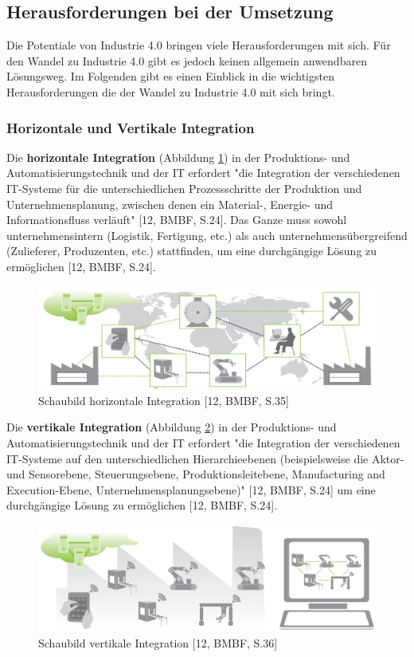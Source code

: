 \subsection{Herausforderungen bei der Umsetzung}\label{sec:HerausforderungenUmsetzung}

Die Potentiale von Industrie 4.0 bringen viele Herausforderungen mit sich. Für den Wandel zu Industrie 4.0 gibt es jedoch keinen allgemein anwendbaren Lösungsweg. Im Folgenden gibt es einen Einblick in die wichtigsten Herausforderungen die der Wandel zu Industrie 4.0 mit sich bringt.

\subsubsection{Horizontale und Vertikale Integration}\label{sec:HorizontaleVertikaleIntegration}
Die \textbf{horizontale Integration} (Abbildung \ref{fig:HorizontaleIntegration}) in der Produktions- und Automatisierungstechnik und der IT erfordert "die Integration der verschiedenen IT-Systeme für die unterschiedlichen Prozessschritte der Produktion und Unternehmensplanung, zwischen denen ein Material-, Energie- und Informationsfluss verläuft" [12, BMBF, S.24]. Das Ganze muss sowohl unternehmensintern (Logistik, Fertigung, etc.) als auch unternehmensübergreifend (Zulieferer, Produzenten, etc.) stattfinden, um eine durchgängige Lösung zu ermöglichen [12, BMBF, S.24].

\begin{figure}[h]
	\centering
	\includegraphics[width=0.5\linewidth]{Bilder/A3_HorizontaleIntegration}
	\caption{Schaubild horizontale Integration [12, BMBF, S.35]}
	\label{fig:HorizontaleIntegration}
\end{figure}

Die \textbf{vertikale Integration} (Abbildung \ref{fig:VertikaleIntegration}) in der Produktions- und Automatisierungstechnik und der IT erfordert "die Integration der verschiedenen IT-Systeme auf den unterschiedlichen Hierarchieebenen (beispielsweise die Aktor- und Sensorebene, Steuerungsebene, Produktionsleitebene, Manufacturing and Execution-Ebene, Unternehmensplanungsebene)" [12, BMBF, S.24] um eine durchgängige Lösung zu ermöglichen [12, BMBF, S.24].

\begin{figure}[h]
	\centering
	\includegraphics[width=0.5\linewidth]{Bilder/A4_VertikaleIntegration}
	\caption{Schaubild vertikale Integration [12, BMBF, S.36]}
	\label{fig:VertikaleIntegration}
\end{figure}

